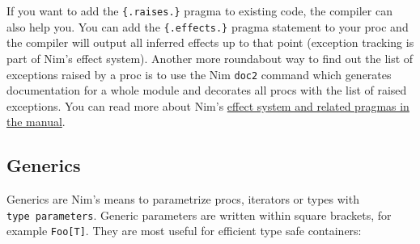 If you want to add the \texttt{\{.raises.\}} pragma to existing code,
the compiler can also help you. You can add the \texttt{\{.effects.\}}
pragma statement to your proc and the compiler will output all inferred
effects up to that point (exception tracking is part of Nim's effect
system). Another more roundabout way to find out the list of exceptions
raised by a proc is to use the Nim \texttt{doc2} command which generates
documentation for a whole module and decorates all procs with the list
of raised exceptions. You can read more about Nim's
\href{manual.html\#effect-system}{effect system and related pragmas in
the manual}.

\hypertarget{generics}{%
\subsection{Generics}\label{generics}}

Generics are Nim's means to parametrize procs, iterators or types with
\texttt{type\ parameters}. Generic parameters are written within square
brackets, for example \texttt{Foo{[}T{]}}. They are most useful for
efficient type safe containers:

\begin{verbatim}
\end{verbatim}

